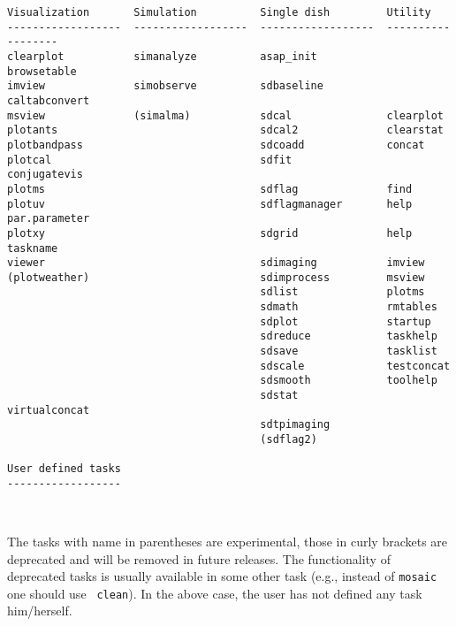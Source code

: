 \begin{verbatim}
Visualization       Simulation          Single dish         Utility           
------------------  ------------------  ------------------  ------------------
clearplot           simanalyze          asap_init           browsetable       
imview              simobserve          sdbaseline          caltabconvert     
msview              (simalma)           sdcal               clearplot         
plotants                                sdcal2              clearstat         
plotbandpass                            sdcoadd             concat            
plotcal                                 sdfit               conjugatevis      
plotms                                  sdflag              find              
plotuv                                  sdflagmanager       help par.parameter
plotxy                                  sdgrid              help taskname     
viewer                                  sdimaging           imview            
(plotweather)                           sdimprocess         msview            
                                        sdlist              plotms            
                                        sdmath              rmtables          
                                        sdplot              startup           
                                        sdreduce            taskhelp          
                                        sdsave              tasklist          
                                        sdscale             testconcat        
                                        sdsmooth            toolhelp          
                                        sdstat              virtualconcat     
                                        sdtpimaging                           
                                        (sdflag2)                             

User defined tasks
------------------



\end{verbatim}
\normalsize The tasks with name in parentheses are experimental, those
in curly brackets are deprecated and will be removed in future
releases. The functionality of deprecated tasks is usually available
in some other task (e.g., instead of {\tt mosaic} one should use {\tt
  clean}). In the above case, the user has not defined any task
him/herself.

